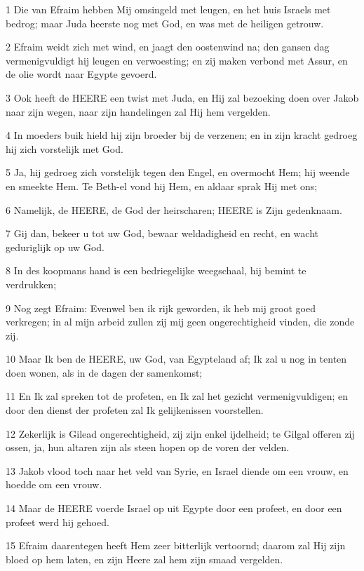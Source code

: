 \par 1 Die van Efraim hebben Mij omsingeld met leugen, en het huis Israels met bedrog; maar Juda heerste nog met God, en was met de heiligen getrouw.
\par 2 Efraim weidt zich met wind, en jaagt den oostenwind na; den gansen dag vermenigvuldigt hij leugen en verwoesting; en zij maken verbond met Assur, en de olie wordt naar Egypte gevoerd.
\par 3 Ook heeft de HEERE een twist met Juda, en Hij zal bezoeking doen over Jakob naar zijn wegen, naar zijn handelingen zal Hij hem vergelden.
\par 4 In moeders buik hield hij zijn broeder bij de verzenen; en in zijn kracht gedroeg hij zich vorstelijk met God.
\par 5 Ja, hij gedroeg zich vorstelijk tegen den Engel, en overmocht Hem; hij weende en smeekte Hem. Te Beth-el vond hij Hem, en aldaar sprak Hij met ons;
\par 6 Namelijk, de HEERE, de God der heirscharen; HEERE is Zijn gedenknaam.
\par 7 Gij dan, bekeer u tot uw God, bewaar weldadigheid en recht, en wacht geduriglijk op uw God.
\par 8 In des koopmans hand is een bedriegelijke weegschaal, hij bemint te verdrukken;
\par 9 Nog zegt Efraim: Evenwel ben ik rijk geworden, ik heb mij groot goed verkregen; in al mijn arbeid zullen zij mij geen ongerechtigheid vinden, die zonde zij.
\par 10 Maar Ik ben de HEERE, uw God, van Egypteland af; Ik zal u nog in tenten doen wonen, als in de dagen der samenkomst;
\par 11 En Ik zal spreken tot de profeten, en Ik zal het gezicht vermenigvuldigen; en door den dienst der profeten zal Ik gelijkenissen voorstellen.
\par 12 Zekerlijk is Gilead ongerechtigheid, zij zijn enkel ijdelheid; te Gilgal offeren zij ossen, ja, hun altaren zijn als steen hopen op de voren der velden.
\par 13 Jakob vlood toch naar het veld van Syrie, en Israel diende om een vrouw, en hoedde om een vrouw.
\par 14 Maar de HEERE voerde Israel op uit Egypte door een profeet, en door een profeet werd hij gehoed.
\par 15 Efraim daarentegen heeft Hem zeer bitterlijk vertoornd; daarom zal Hij zijn bloed op hem laten, en zijn Heere zal hem zijn smaad vergelden.

